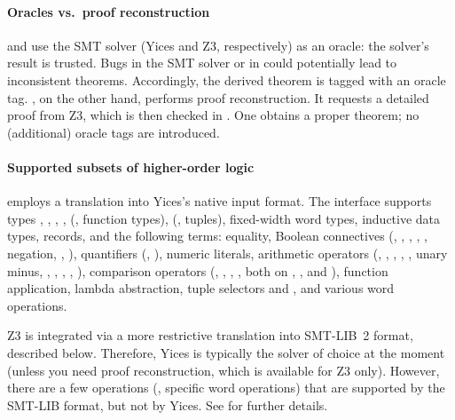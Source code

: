 \paragraph{Oracles vs.\ proof reconstruction}

 and  use the SMT solver (Yices and
Z3, respectively) as an oracle: the solver's result is trusted.  Bugs
in the SMT solver or in  could potentially lead to
inconsistent theorems.  Accordingly, the derived theorem is tagged
with an oracle tag. , on the other hand, performs proof
reconstruction.  It requests a detailed proof from Z3, which is then
checked in \HOL{}.  One obtains a proper \HOL{} theorem; no
(additional) oracle tags are introduced.

\paragraph{Supported subsets of higher-order logic}

 employs a translation into Yices's native input
format.  The interface supports types , ,
, , \holtxt{->} (\ie, function types),
 (\ie, tuples), fixed-width word types, inductive data
types, records, and the following terms: equality, Boolean connectives
(, , \holtxt{==>}, \holtxt{/\bs}, \holtxt{\bs /},
negation, , ), quantifiers
(\holtxt{!}, ), numeric literals, arithmetic operators
(, \holtxt{+}, \holtxt{-}, \holtxt{*}, \holtxt{/}, unary
minus, , , , ,
), comparison operators (\holtxt{<}, \holtxt{<=},
\holtxt{>}, \holtxt{>=}, both on , , and
), function application, lambda abstraction, tuple
selectors  and , and various word operations.

Z3 is integrated via a more restrictive translation into SMT-LIB~2
format, described below.  Therefore, Yices is typically the solver of
choice at the moment (unless you need proof reconstruction, which is
available for Z3 only).  However, there are a few operations (\eg,
specific word operations) that are supported by the SMT-LIB format,
but not by Yices.  See  for further details.

